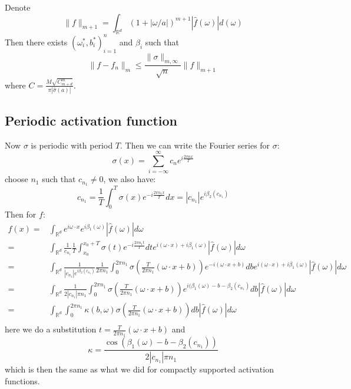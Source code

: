 Denote
$$
\|f\|_{m+1} = \int_{\mathbb{R}^d}(1+|\omega/a|)^{m+1} |\hat{f}(\omega)|d(\omega)
$$
Then there exists $(\omega_i^*,b_i^*)_{i=1}^n$ and $\beta_i$ such that 
$$
\|f-f_n\|_m
\le\frac{\|\sigma\|_{m,\infty}}{\sqrt{n}}\|f\|_{m+1} 
$$
where $C=\frac{M\sqrt{C_{m+d}^m}}{\pi|\hat{\sigma}(a)|} $.

\subsection{Periodic activation function}

Now $\sigma$ is periodic with period $T$. Then we can write the Fourier series for $\sigma$:
$$
\sigma(x) =  \sum_{i=-\infty}^{\infty}c_n e^{i\frac{2\pi nx}{T}}
$$
choose $n_1$ such that $c_{n_1}\ne 0$, we also have:
$$
c_{n_1} = \frac{1}{T}\int_{0}^{T}\sigma(x) e^{-i\frac{2\pi n_1x}{T}}dx= |c_{n_1}|e^{i\beta_2(c_{n_1})}
$$
Then for $f$:
\begin{equation}
\begin{aligned}
f(x)=& \int_{\mathbb{R}^d}e^{i\omega\cdot x}e^{i\beta_1(\omega)}|\hat{f}(\omega)|d\omega\\
=&\int_{\mathbb{R}^d}\frac{1}{c_{n_1}}\frac{1}{T}\int_{x_0}^{x_0+T}\sigma(t) e^{-i\frac{2\pi n_1t}{T}}dte^{i(\omega\cdot x)+i\beta_1(\omega)}|\hat{f}(\omega)|d\omega \\
=&\int_{\mathbb{R}^d}\frac{1}{|c_{n_1}|e^{i\beta_2(c_{n_1})}}\frac{1}{2\pi n_1}\int_{0}^{2\pi n_1}\sigma(\frac{T}{2\pi n_1}(\omega\cdot x+b)) e^{-i(\omega\cdot x+b)}dbe^{i(\omega\cdot x)+i\beta_1(\omega)}|\hat{f}(\omega)|d\omega \\
=&\int_{\mathbb{R}^d}\frac{1}{2|c_{n_1}|\pi n_1}\int_{0}^{2\pi n_1}\sigma(\frac{T}{2\pi n_1}(\omega\cdot x+b)) e^{i(\beta_1(\omega)-b-\beta_2(c_{n_1})}db|\hat{f}(\omega)|d\omega \\
=&\int_{\mathbb{R}^d}\int_{0}^{2\pi n_1}\kappa(b,\omega)\sigma(\frac{T}{2\pi n_1}(\omega\cdot x+b)) db|\hat{f}(\omega)|d\omega \\
\end{aligned}
\end{equation}
here we do a substitution $t=\frac{T}{2\pi n_1}(\omega\cdot x+b)$ and 
\begin{equation}
\kappa = \frac{\cos(\beta_1(\omega)-b-\beta_2(c_{n_1}))}{2|c_{n_1}|\pi n_1}
\end{equation}
which is then the same as what we did for compactly supported activation functions.
